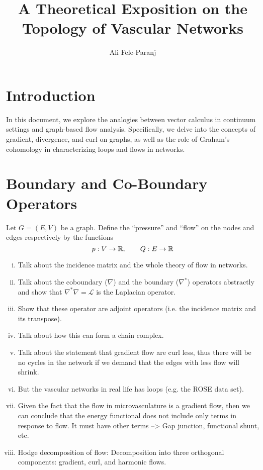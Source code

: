 \documentclass[10pt,a4paper,twocolumn]{article}
\title{A Theoretical Exposition on the Topology of Vascular Networks}
\author{Ali Fele-Paranj}
\begin{document}
	\maketitle

	\section{Introduction}
	In this document, we explore the analogies between vector calculus in continuum settings and graph-based flow analysis. Specifically, we delve into the concepts of gradient, divergence, and curl on graphs, as well as the role of Graham's cohomology in characterizing loops and flows in networks.
	
	
	
	\section{Boundary and Co-Boundary Operators}
	Let $ G = (E,V) $ be a graph. Define the ``pressure'' and ``flow'' on the nodes and edges respectively by the functions
	\[ p:V \to \mathbb{R}, \qquad Q: E \to \mathbb{R} \]
	
	\begin{enumerate}[(i)]
		\item Talk about the incidence matrix and the whole theory of flow in networks. 
		\item Talk about the coboundary ($ \nabla $) and the boundary ($ \nabla^* $) operators abstractly and show that $ \nabla^*\nabla = \mathcal{L} $ is the Laplacian operator.
		\item Show that these operator are adjoint operators (i.e. the incidence matrix and its transpose).
		\item Talk about how this can form a chain complex.
		\item Talk about the statement that gradient flow are curl less, thus there will be no cycles in the network if we demand that the edges with less flow will shrink.
		\item But the vascular networks in real life has loops (e.g. the ROSE data set).
		\item Given the fact that the flow in microvasculature is a gradient flow, then we can conclude that the energy functional does not include only terms in response to flow. It must have other terms --> Gap junction, functional shunt, etc.
		\item Hodge decomposition of flow: Decomposition into three orthogonal components: gradient, curl, and harmonic flows.
 	\end{enumerate}
	
\end{document}
